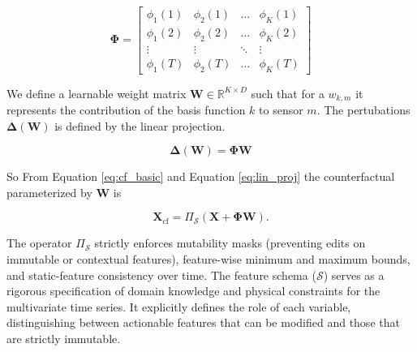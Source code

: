 \documentclass[runningheads]{llncs}
\begin{document}
	\begin{equation}
		\mathbf{\Phi} = 
		\begin{bmatrix}
			\phi_1(1) & \phi_2(1) & \dots & \phi_K(1) \\
			\phi_1(2) & \phi_2(2) & \dots & \phi_K(2) \\
			\vdots & \vdots & \ddots & \vdots \\
			\phi_1(T) & \phi_2(T) & \dots & \phi_K(T)
		\end{bmatrix}
	\end{equation}
	
	We define a learnable weight matrix $\mathbf{W} \in \mathbb{R}^{K \times D}$ such that for a $w_{k,m}$ it represents the contribution of the basis function $k$ to sensor $m$. The pertubations $\mathbf{\Delta}(\mathbf{W})$ is defined by the linear projection.
	
	\begin{equation}
		\label{eq:lin_proj}
		\mathbf{\Delta}(\mathbf{W}) = \mathbf{\Phi}\mathbf{W}
	\end{equation}
	
	So From Equation \ref{eq:cf_basic} and Equation \ref{eq:lin_proj} the counterfactual parameterized by $\mathbf{W}$ is 
	
	
	\begin{equation}
		\label{eq:xcf_schema}
		\mathbf{X}_{\mathrm{cf}} = \Pi_{\mathcal{S}}(\mathbf{X} + \mathbf{\Phi}\mathbf{W}).
	\end{equation}
	
	The operator \(\Pi_{\mathcal{S}}\) strictly enforces mutability masks (preventing edits on immutable or contextual features), feature-wise minimum and maximum bounds, and static-feature consistency over time.
	The feature schema ($\mathcal{S}$) serves as a rigorous specification of domain knowledge and physical constraints for the multivariate time series.
	It explicitly defines the role of each variable, distinguishing between actionable features that can be modified and those that are strictly immutable.
	
\end{document}
